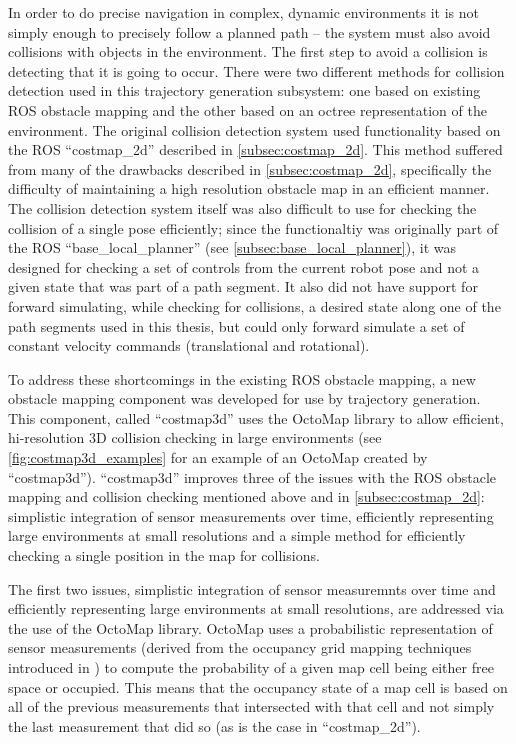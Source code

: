 In order to do precise navigation in complex, dynamic environments it is not simply enough to precisely follow a planned path -- the system must also avoid collisions with objects in the environment. The first step to avoid a collision is detecting that it is going to occur. There were two different methods for collision detection used in this trajectory generation subsystem: one based on existing ROS obstacle mapping and the other based on an octree representation of the environment. The original collision detection system used functionality based on the ROS ``costmap\_2d'' described in \autoref{subsec:costmap_2d}. This method suffered from many of the drawbacks described in \autoref{subsec:costmap_2d}, specifically the difficulty of maintaining a high resolution obstacle map in an efficient manner. The collision detection system itself was also difficult to use for checking the collision of a single pose efficiently; since the functionaltiy was originally part of the ROS ``base\_local\_planner'' (see \autoref{subsec:base_local_planner}), it was designed for checking a set of controls from the current robot pose and not a given state that was part of a path segment. It also did not have support for forward simulating, while checking for collisions, a desired state along one of the path segments used in this thesis, but could only forward simulate a set of constant velocity commands (translational and rotational).

To address these shortcomings in the existing ROS obstacle mapping, a new obstacle mapping component was developed for use by trajectory generation. This component, called ``costmap3d'' uses the OctoMap library \autocite{octomap} to allow efficient, hi-resolution 3D collision checking in large environments (see \autoref{fig:costmap3d_examples} for an example of an OctoMap created by ``costmap3d''). ``costmap3d'' improves three of the issues with the ROS obstacle mapping and collision checking mentioned above and in \autoref{subsec:costmap_2d}: simplistic integration of sensor measurements over time, efficiently representing large environments at small resolutions and a simple method for efficiently checking a single position in the map for collisions.

The first two issues, simplistic integration of sensor measuremnts over time and efficiently representing large environments at small resolutions, are addressed via the use of the OctoMap library. OctoMap uses a probabilistic representation of sensor measurements (derived from the occupancy grid mapping techniques introduced in \autocite{Moravec_1985_1840}) to compute the probability of a given map cell being either free space or occupied. This means that the occupancy state of a map cell is based on all of the previous measurements that intersected with that cell and not simply the last measurement that did so (as is the case in ``costmap\_2d'').

